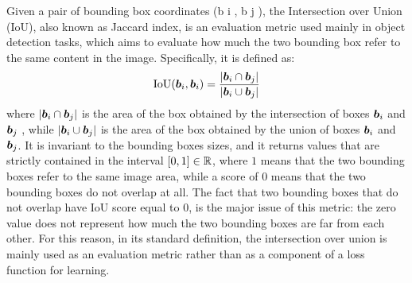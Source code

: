 Given a pair of bounding box coordinates (b i , b j ), the
Intersection over Union (IoU), also known as Jaccard index, is an evaluation metric used mainly in object detection
tasks, which aims to evaluate how much the two bounding
box refer to the same content in the image. Specifically, it
is defined as:
\[
  \text{IoU}(\bm{b}_i, \bm{b}_i) = \frac{| \bm{b}_i \cap \bm{b}_j |}{| \bm{b}_i \cup \bm{b}_j |}
\]
where $| \bm{b}_i \cap \bm{b}_j |$ is the area of the box obtained by
the intersection of boxes $\bm{b}_i$ and $\bm{b}_j$ , while $| \bm{b}_i
\cup \bm{b}_j |$ is the area of the box obtained by the union of
boxes $\bm{b}_i$ and $\bm{b}_j$. It is invariant to the bounding boxes
sizes, and it returns values that are strictly contained in the
interval $[0, 1] \in \mathbb{R}$, where $1$ means that the two bounding
boxes refer to the same image area, while a score of $0$ means that
the two bounding boxes do not overlap at all. The fact that two
bounding boxes that do not overlap have IoU score equal to $0$, is the
major issue of this metric: the zero value does not represent how much
the two bounding boxes are far from each other. For this reason, in
its standard definition, the intersection over union is mainly used as
an evaluation metric rather than as a component of a loss function for
learning.
